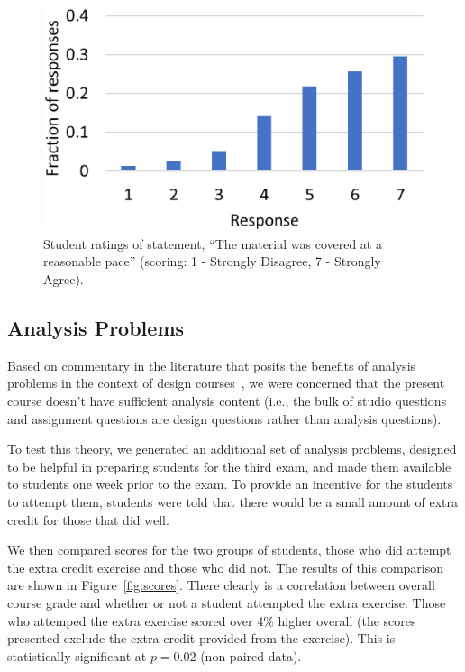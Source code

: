 \begin{figure}[ht]
\centering
\includegraphics[width=\columnwidth]{pace}
\caption{Student ratings of statement, ``The material was covered
at a reasonable pace''  (scoring: 1 - Strongly Disagree, 7 - Strongly Agree).}
\label{fig:pace}
\end{figure}

\subsection{Analysis Problems}

Based on commentary in the literature that posits the benefits of analysis problems in the context of design courses~\cite{wjbo01}, we were concerned that the present course doesn't have sufficient analysis content (i.e., the bulk of studio questions and assignment questions are design questions rather than analysis questions).

To test this theory, we generated an additional set of analysis problems, designed to be helpful in preparing students for the third exam, and made them available to students one week prior to the exam.  To provide an incentive for the students to attempt them, students were told that there would be a small amount of extra credit for those that did well.

We then compared scores for the two groups of students, those who did attempt the extra credit exercise and those who did not.  The results of this comparison are shown in Figure~\ref{fig:scores}. There clearly is a correlation between overall course grade and whether or not a student attempted the extra exercise. Those who attemped the extra exercise scored over 4\% higher overall (the scores presented exclude the extra credit provided from the exercise).  This is statistically significant at $p = 0.02$ (non-paired data).

